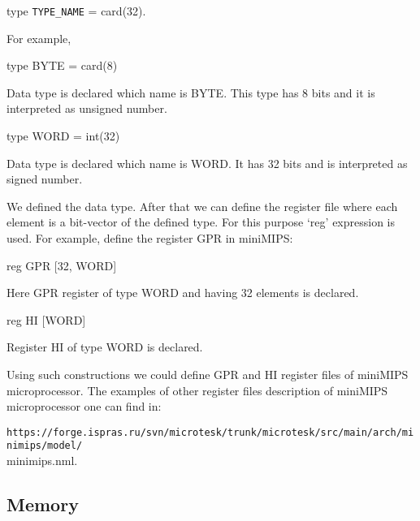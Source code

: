 \documentclass[oneside,final,12pt]{extreport}
\begin{document}
\bigskip

type \lstinline!TYPE_NAME! = card(32).

\bigskip



For example,

\bigskip

type BYTE = card(8) 

\bigskip

Data type is declared which name is BYTE. This type has 8 bits and it is interpreted as unsigned number.

\bigskip

type WORD = int(32) 

\bigskip

Data type is declared which name is WORD. It has 32 bits and is interpreted as signed number. 

\bigskip


\bigskip

We defined the data type. After that we can define the register file where each element is a bit-vector of the defined type. For this purpose ‘reg’ expression is used. For example, define the register GPR in miniMIPS: 

\bigskip reg GPR [32, WORD] 

\bigskip

Here GPR register of type WORD and having 32 elements is declared. 

\bigskip

reg HI [WORD] 

\bigskip

Register HI of type WORD is declared.

\bigskip

Using such constructions we could define GPR and HI register files of miniMIPS microprocessor.
The examples of other register files description of miniMIPS microprocessor one can find in: 


\lstinline!https://forge.ispras.ru/svn/microtesk/trunk/microtesk/src/main/arch/minimips/model/!\\minimips.nml.


\bigskip


\subsection*{Memory}
\end{document}

